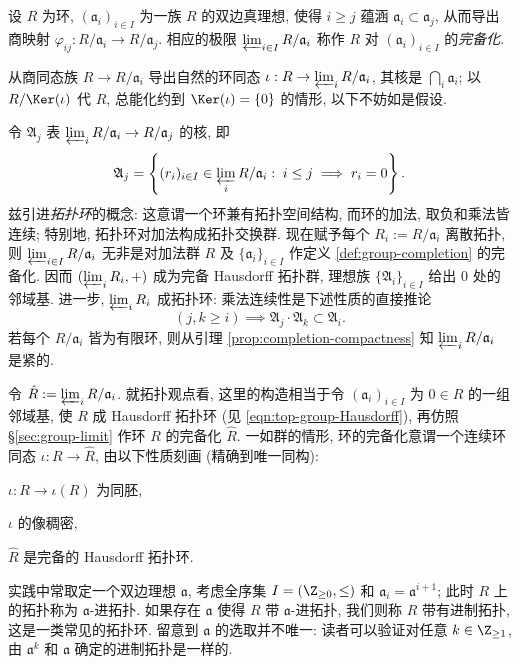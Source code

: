 \begin{definition}[环的完备化]\label{def:ring-completion}
	设 $R$ 为环, $(\mathfrak{a}_i)_{i \in I}$ 为一族 $R$ 的双边真理想, 使得 $i \geq j$ 蕴涵 $\mathfrak{a}_i \subset \mathfrak{a}_j$, 从而导出商映射 $\varphi_{ij}: R/\mathfrak{a}_i \to R/\mathfrak{a}_j$. 相应的极限 $\varprojlim_{i \in I} R/\mathfrak{a}_i$ 称作 $R$ 对 $(\mathfrak{a}_i)_{i \in I}$ 的\emph{完备化}.
\end{definition}
从商同态族 $R \to R/\mathfrak{a}_i$ 导出自然的环同态 $\iota: R \to \varprojlim_i R/\mathfrak{a}_i$, 其核是 $\bigcap_i \mathfrak{a}_i$; 以 $R/\Ker(\iota)$ 代 $R$, 总能化约到 $\Ker(\iota)=\{0\}$ 的情形, 以下不妨如是假设.

令 $\mathfrak{A}_j$ 表 $\varprojlim_i R/\mathfrak{a}_i \to R/\mathfrak{a}_j$ 的核, 即
\[ \mathfrak{A}_j = \left\{ (r_i)_{i \in I} \in \varprojlim_i R/\mathfrak{a}_i : \; i \leq j \implies r_i=0 \right\}. \]
兹引进\emph{拓扑环}的概念:  这意谓一个环兼有拓扑空间结构, 而环的加法, 取负和乘法皆连续; 特别地, 拓扑环对加法构成拓扑交换群. 现在赋予每个 $R_i := R/\mathfrak{a}_i$ 离散拓扑, 则 $\varprojlim_{i \in I} R/\mathfrak{a}_i$ 无非是对加法群 $R$ 及 $\{\mathfrak{a}_i\}_{i \in I}$ 作定义 \ref{def:group-completion} 的完备化. 因而 $(\varprojlim_i R_i, +)$ 成为完备 Hausdorff 拓扑群, 理想族 $\{\mathfrak{A}_i\}_{i \in I}$ 给出 $0$ 处的邻域基. 进一步, $\varprojlim_i R_i$ 成拓扑环: 乘法连续性是下述性质的直接推论
\[ (j,k \geq i) \implies \mathfrak{A}_j \cdot \mathfrak{A}_k \subset \mathfrak{A}_i. \]
若每个 $R/\mathfrak{a}_i$ 皆为有限环, 则从引理 \ref{prop:completion-compactness} 知 $\varprojlim_i R/\mathfrak{a}_i$ 是紧的.

\begin{remark}\label{rem:ring-completion} 
	令 $\hat{R} := \varprojlim_i R/\mathfrak{a}_i$. 就拓扑观点看, 这里的构造相当于令 $(\mathfrak{a}_i)_{i \in I}$ 为 $0 \in R$ 的一组邻域基, 使 $R$ 成 Hausdorff 拓扑环 (见 \eqref{eqn:top-group-Hausdorff}), 再仿照 \S\ref{sec:group-limit} 作环 $R$ 的完备化 $\hat{R}$. 一如群的情形, 环的完备化意谓一个连续环同态 $\iota: R \to \hat{R}$, 由以下性质刻画 (精确到唯一同构):
	\begin{compactenum}[\bfseries {CO}.1]
		\item $\iota: R \to \iota(R)$ 为同胚,
		\item $\iota$ 的像稠密,
		\item $\hat{R}$ 是完备的 Hausdorff 拓扑环.
	\end{compactenum}
	实践中常取定一个双边理想 $\mathfrak{a}$, 考虑全序集 $I = (\Z_{\geq 0}, \leq)$ 和 $\mathfrak{a}_i = \mathfrak{a}^{i+1}$; 此时 $R$ 上的拓扑称为 $\mathfrak{a}$-进拓扑. 如果存在 $\mathfrak{a}$ 使得 $R$ 带 $\mathfrak{a}$-进拓扑, 我们则称 $R$ 带有进制拓扑, 这是一类常见的拓扑环. 留意到 $\mathfrak{a}$ 的选取并不唯一: 读者可以验证对任意 $k \in \Z_{\geq 1}$, 由 $\mathfrak{a}^k$ 和 $\mathfrak{a}$ 确定的进制拓扑是一样的. 
\end{remark}

